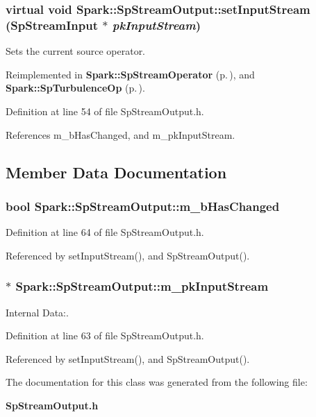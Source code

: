 \subsubsection{\setlength{\rightskip}{0pt plus 5cm}virtual void Spark::Sp\-Stream\-Output::set\-Input\-Stream ({\bf Sp\-Stream\-Input} $\ast$ {\em pk\-Input\-Stream})\hspace{0.3cm}{\tt  [inline, virtual]}}\label{classSpark_1_1SpStreamOutput_a2}


Sets the current source operator. 



Reimplemented in {\bf Spark::Sp\-Stream\-Operator} {\rm (p.\,\pageref{classSpark_1_1SpStreamOperator_a2})}, and {\bf Spark::Sp\-Turbulence\-Op} {\rm (p.\,\pageref{classSpark_1_1SpTurbulenceOp_a4})}.

Definition at line 54 of file Sp\-Stream\-Output.h.

References m\_\-b\-Has\-Changed, and m\_\-pk\-Input\-Stream.

\subsection{Member Data Documentation}
\subsubsection{\setlength{\rightskip}{0pt plus 5cm}bool {\bf Spark::Sp\-Stream\-Output::m\_\-b\-Has\-Changed}\hspace{0.3cm}{\tt  [protected]}}\label{classSpark_1_1SpStreamOutput_p1}


Definition at line 64 of file Sp\-Stream\-Output.h.

Referenced by set\-Input\-Stream(), and Sp\-Stream\-Output().
\subsubsection{$\ast$ {\bf Spark::Sp\-Stream\-Output::m\_\-pk\-Input\-Stream}\hspace{0.3cm}{\tt  [protected]}}\label{classSpark_1_1SpStreamOutput_p0}


Internal Data:. 

Definition at line 63 of file Sp\-Stream\-Output.h.

Referenced by set\-Input\-Stream(), and Sp\-Stream\-Output().

The documentation for this class was generated from the following file:\begin{CompactItemize}
\item 
{\bf Sp\-Stream\-Output.h}\end{CompactItemize}
